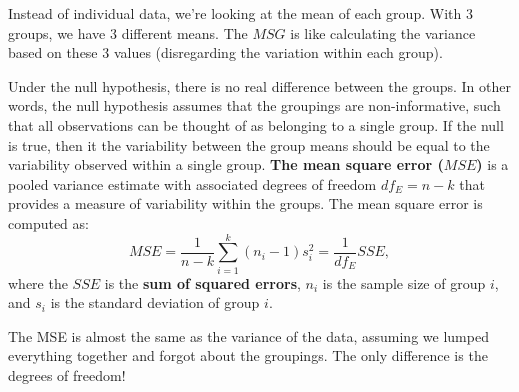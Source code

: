 \documentclass[
  letterpaper,
  DIV=11,
  numbers=noendperiod,
  oneside]{scrreprt}
\begin{document}
\begin{tcolorbox}[enhanced jigsaw, toprule=.15mm, colbacktitle=quarto-callout-note-color!10!white, title=\textcolor{quarto-callout-note-color}{\faInfo}\hspace{0.5em}{MSG is the variance \emph{of the means}}, arc=.35mm, colframe=quarto-callout-note-color-frame, colback=white, titlerule=0mm, left=2mm, bottomtitle=1mm, bottomrule=.15mm, breakable, opacitybacktitle=0.6, leftrule=.75mm, toptitle=1mm, coltitle=black, rightrule=.15mm, opacityback=0]

Instead of individual data, we're looking at the mean of each group.
With 3 groups, we have 3 different means. The \(MSG\) is like
calculating the variance based on these 3 values (disregarding the
variation within each group).

\end{tcolorbox}

Under the null hypothesis, there is no real difference between the
groups. In other words, the null hypothesis assumes that the groupings
are non-informative, such that all observations can be thought of as
belonging to a single group. If the null is true, then it the
variability between the group means should be equal to the variability
observed within a single group. \textbf{The mean square error (\(MSE\))}
is a pooled variance estimate with associated degrees of freedom
\(df_E=n-k\) that provides a measure of variability within the groups.
The mean square error is computed as: \[
MSE = \frac{1}{n-k}\sum_{i=1}^{k} (n_i-1)s_i^{2} = \frac{1}{df_{E}}SSE,
\] where the \(SSE\) is the \textbf{sum of squared errors}, \(n_i\) is
the sample size of group \(i\), and \(s_i\) is the standard deviation of
group \(i\).

\begin{tcolorbox}[enhanced jigsaw, toprule=.15mm, colbacktitle=quarto-callout-note-color!10!white, title=\textcolor{quarto-callout-note-color}{\faInfo}\hspace{0.5em}{The MSE is the variance \emph{as if there are no groups}}, arc=.35mm, colframe=quarto-callout-note-color-frame, colback=white, titlerule=0mm, left=2mm, bottomtitle=1mm, bottomrule=.15mm, breakable, opacitybacktitle=0.6, leftrule=.75mm, toptitle=1mm, coltitle=black, rightrule=.15mm, opacityback=0]

The MSE is almost the same as the variance of the data, assuming we
lumped everything together and forgot about the groupings. The only
difference is the degrees of freedom!

\end{tcolorbox}
\end{document}
